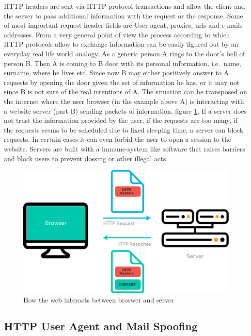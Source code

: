 \documentclass[
  12pt,
  a4paper,
  oneside]{book}
\theoremstyle{definition}
\theoremstyle{definition}
\theoremstyle{definition}
\theoremstyle{remark}
\begin{document}
HTTP headers are sent via HTTP protocol transactions and allow the client and the server to pass additional information with the request or the response. Some of most important request header fields are User agent, proxies, urls and e-mails addresses. From a very general point of view the process according to which HTTP protocols allow to exchange information can be easily figured out by an everyday real life world analogy. As a generic person A rings to the door's bell of person B. Then A is coming to B door with its personal information, i.e.~name, surname, where he lives etc. Since now B may either positively answer to A requests by opening the door given the set of information he has, or it may not since B is not sure of the real intentions of A. The situation can be transposed on the internet where the user browser (in the example above A) is interacting with a website server (part B) sending packets of information, figure \ref{fig:webworks}. If a server does not trust the information provided by the user, if the requests are too many, if the requests seems to be scheduled due to fixed sleeping time, a server can block requests. In certain cases it can even forbid the user to open a session to the website. Servers are built with a immune-system like software that raises barriers and block users to prevent dossing or other illegal acts.

\begin{figure}
\centering
\includegraphics{images/how_web_works.png}
\caption{\label{fig:webworks}How the web interacts between broswer and server}
\end{figure}

\hypertarget{spoofing}{%
\subsection{HTTP User Agent and Mail Spoofing}\label{spoofing}}
\end{document}

